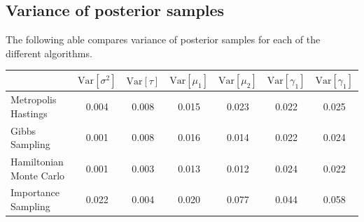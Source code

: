 \documentclass[12pt,letterpaper,twoside]{article}
\begin{document}
\subsection{Variance of posterior samples}
The following able compares variance of posterior samples for each of the different algorithms.
\begin{table}[H]
    \begin{tabular}{lcccccc}
    \hline
    \multicolumn{1}{c}{}         & $\text{Var}[\sigma^2]$ & $\text{Var}[\tau]$   & $\text{Var}[\mu_1]$   & $\text{Var}[\mu_2]$   & $\text{Var}[\gamma_1]$  & $\text{Var}[\gamma_1]$  \\
    \hline
    Metropolis Hastings          & 0.004 & 0.008 & 0.015 & 0.023 & 0.022 & 0.025 \\
    Gibbs Sampling               & 0.001 & 0.008 & 0.016 & 0.014 & 0.022 & 0.024 \\
    Hamiltonian Monte Carlo      & 0.001 & 0.003 & 0.013 & 0.012 & 0.024 & 0.022  \\  
    Importance Sampling          & 0.022 & 0.004 & 0.020 & 0.077 & 0.044 & 0.058  \\
    \hline
    \end{tabular}
\end{table}
\end{document}
